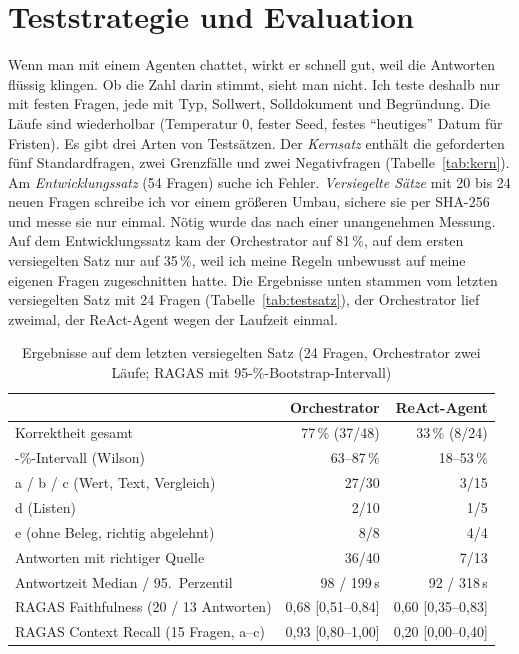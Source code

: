 
\chapter{Teststrategie und Evaluation}
\label{chap:evaluation}

Wenn man mit einem Agenten chattet, wirkt er schnell gut, weil die Antworten flüssig klingen. Ob die Zahl darin stimmt, sieht man nicht. Ich teste deshalb nur mit festen Fragen, jede mit Typ, Sollwert, Solldokument und Begründung. Die Läufe sind wiederholbar (Temperatur 0, fester Seed, festes \enquote{heutiges} Datum für Fristen). Es gibt drei Arten von Testsätzen. Der \emph{Kernsatz} enthält die geforderten fünf Standardfragen, zwei Grenzfälle und zwei Negativfragen (Tabelle~\ref{tab:kern}). Am \emph{Entwicklungssatz} (54 Fragen) suche ich Fehler. \emph{Versiegelte Sätze} mit 20 bis 24 neuen Fragen schreibe ich vor einem größeren Umbau, sichere sie per SHA-256 und messe sie nur einmal. Nötig wurde das nach einer unangenehmen Messung. Auf dem Entwicklungssatz kam der Orchestrator auf 81\,\%, auf dem ersten versiegelten Satz nur auf 35\,\%, weil ich meine Regeln unbewusst auf meine eigenen Fragen zugeschnitten hatte. Die Ergebnisse unten stammen vom letzten versiegelten Satz mit 24 Fragen (Tabelle~\ref{tab:testsatz}), der Orchestrator lief zweimal, der ReAct-Agent wegen der Laufzeit einmal.

\begin{table}[tb]
    \centering\small
    \begin{tabular}{@{}l r r@{}}
        \toprule
        & \textbf{Orchestrator} & \textbf{ReAct-Agent} \\
        \midrule
        Korrektheit gesamt & 77\,\% (37/48) & 33\,\% (8/24) \\
        \quad 95-\%-Intervall (Wilson) & 63--87\,\% & 18--53\,\% \\
        \quad a / b / c (Wert, Text, Vergleich) & 27/30 & 3/15 \\
        \quad d (Listen) & 2/10 & 1/5 \\
        \quad e (ohne Beleg, richtig abgelehnt) & 8/8 & 4/4 \\
        Antworten mit richtiger Quelle & 36/40 & 7/13 \\
        Antwortzeit Median / 95.~Perzentil & 98 / 199\,s & 92 / 318\,s \\
        \midrule
        RAGAS Faithfulness (20 / 13 Antworten) & 0,68 [0,51--0,84] & 0,60 [0,35--0,83] \\
        RAGAS Context Recall (15 Fragen, a--c) & 0,93 [0,80--1,00] & 0,20 [0,00--0,40] \\
        \bottomrule
    \end{tabular}
    \caption{Ergebnisse auf dem letzten versiegelten Satz (24 Fragen, Orchestrator zwei Läufe; RAGAS mit 95-\%-Bootstrap-Intervall)}
    \label{tab:ergebnisse}
\end{table}

